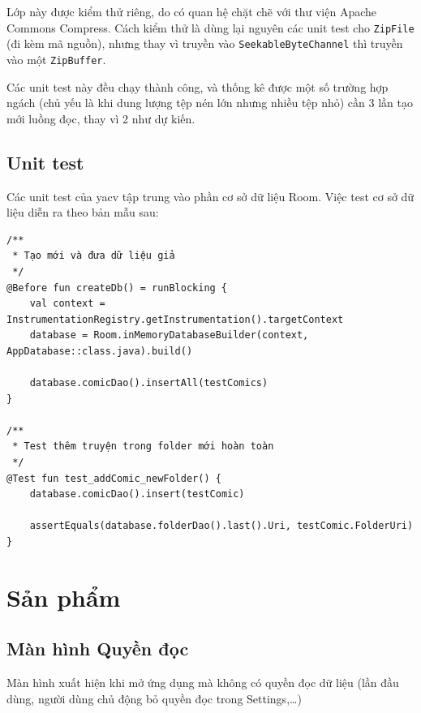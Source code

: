 \documentclass[../../thesis]{subfiles}
\begin{document}
Lớp này được kiểm thử riêng, do có quan hệ chặt chẽ với thư viện Apache Commons
Compress. Cách kiểm thử là dùng lại nguyên các unit test cho \texttt{ZipFile}
(đi kèm mã nguồn), nhưng thay vì truyền vào \texttt{SeekableByteChannel} thì
truyền vào một \texttt{ZipBuffer}.

Các unit test này đều chạy thành công, và thống kê được một số trường hợp ngách
(chủ yếu là khi dung lượng tệp nén lớn nhưng nhiều tệp nhỏ) cần 3 lần tạo mới
luồng đọc, thay vì 2 như dự kiến.

\subsection{Unit test}

Các unit test của yacv tập trung vào phần cơ sở dữ liệu Room. Việc test cơ sở dữ
liệu diễn ra theo bản mẫu sau:

\begin{verbatim}
/**
 * Tạo mới và đưa dữ liệu giả
 */
@Before fun createDb() = runBlocking {
    val context = InstrumentationRegistry.getInstrumentation().targetContext
    database = Room.inMemoryDatabaseBuilder(context, AppDatabase::class.java).build()

    database.comicDao().insertAll(testComics)
}

/**
 * Test thêm truyện trong folder mới hoàn toàn
 */
@Test fun test_addComic_newFolder() {
    database.comicDao().insert(testComic)

    assertEquals(database.folderDao().last().Uri, testComic.FolderUri)
}
\end{verbatim}



\section{Sản phẩm}\label{sec:app-results}

\subsection{Màn hình Quyền đọc}

Màn hình xuất hiện khi mở ứng dụng mà không có quyền đọc dữ liệu (lần đầu dùng,
người dùng chủ động bỏ quyền đọc trong Settings,\ldots)
\end{document}

